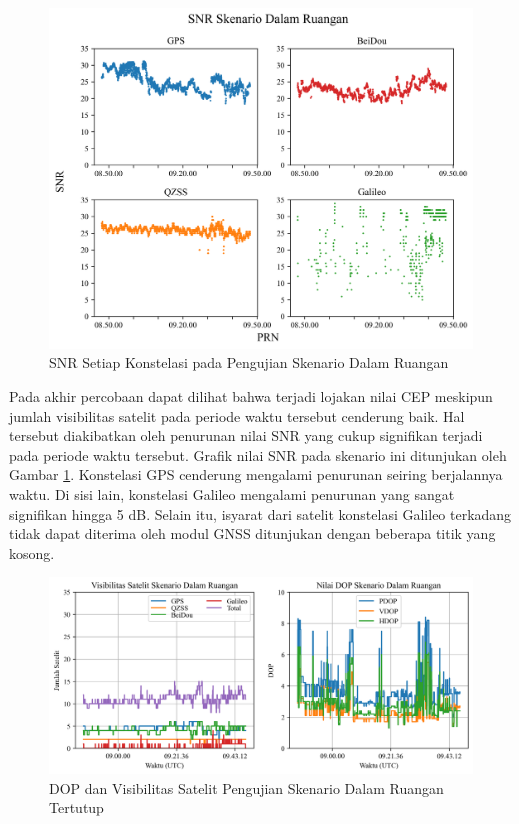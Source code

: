 \begin{figure}[H]
	\centering
	\includegraphics[width=13cm]{contents/chapter-4/2-skenario-indoor/snr.png}
	\caption{SNR Setiap Konstelasi pada Pengujian Skenario Dalam Ruangan}
	\label{Fig: indoor-snr}
\end{figure}

Pada akhir percobaan dapat dilihat bahwa terjadi lojakan nilai CEP meskipun jumlah visibilitas satelit pada periode waktu tersebut cenderung baik. Hal tersebut diakibatkan oleh penurunan nilai SNR yang cukup signifikan terjadi pada periode waktu tersebut. Grafik nilai SNR pada skenario ini ditunjukan oleh Gambar \ref{Fig: indoor-snr}. Konstelasi GPS cenderung mengalami penurunan seiring berjalannya waktu. Di sisi lain, konstelasi Galileo mengalami penurunan yang sangat signifikan hingga 5 dB. Selain itu, isyarat dari satelit konstelasi Galileo terkadang tidak dapat diterima oleh modul GNSS ditunjukan dengan beberapa titik yang kosong.

\begin{figure}[H]
	\centering
	\captionsetup{justification=centering}
	\begin{adjustbox}{width=\textwidth}
		\includegraphics{contents/chapter-4/2-skenario-indoor/sats_dop.png}
	\end{adjustbox}
	\caption{DOP dan Visibilitas Satelit Pengujian Skenario Dalam Ruangan Tertutup}
	\label{Fig: indoor-sats_dop}
\end{figure}

